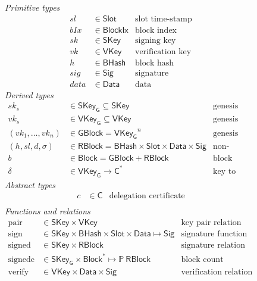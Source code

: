 \documentclass[11pt,a4paper]{article}
\newcommand{\powerset}[1]{\mathbb{P}~#1}
\newcommand{\type}[1]{\mathsf{#1}}
\newcommand{\seqof}[1]{#1^{*}}
\newcommand{\BHash}{\type{BHash}}  %
\newcommand{\Slot}{\type{Slot}}
\newcommand{\BlockIx}{\type{BlockIx}}
\newcommand{\GBlock}{\type{GBlock}}
\newcommand{\RBlock}{\type{RBlock}}
\newcommand{\Block}{\type{Block}}
\newcommand{\HCert}{\type{C}}
\newcommand{\SKey}{\type{SKey}}
\newcommand{\SKeyGen}{\type{SKey_G}}
\newcommand{\VKey}{\type{VKey}}
\newcommand{\VKeyGen}{\type{VKey_G}}
\newcommand{\Sig}{\type{Sig}}
\newcommand{\Data}{\type{Data}}
\newcommand{\signname}{sign}
\newcommand{\signedname}{signed}
\newcommand{\signedseqname}{signedc}
\newcommand{\verifyname}{verify}
\newcommand{\keypairname}{pair}
\newcommand{\delmap}{\delta}
\newcommand{\totalf}{\to}
\newcommand{\partialf}{\mapsto}
\begin{document}
\begin{figure}[h]
  \emph{Primitive types}
  \begin{align*}
    sl & \in \Slot    & \text{slot time-stamp}\\
   bIx & \in \BlockIx & \text{block index}\\
    sk & \in \SKey    & \text{signing key}\\
    vk & \in \VKey    & \text{verification key}\\
     h & \in \BHash   & \text{block hash}\\
   sig & \in \Sig     & \text{signature}\\
  data & \in \Data    & \text{data}
  \end{align*}
  \emph{Derived types}
  \begin{align*}
    sk_s & \in \SKeyGen \subseteq \SKey & \text{genesis block's signing key}\\
    vk_s & \in \VKeyGen \subseteq \VKey & \text{genesis block's verification key}\\
    (vk_1, \dotsc, vk_n) & \in \GBlock = \VKeyGen^n & \text{genesis block} \\
    (h, sl, d, \sigma) & \in \RBlock = \BHash \times \Slot \times \Data \times \Sig
      & \text{non-genesis block} \\
    b & \in \Block = \GBlock + \RBlock & \text{block} \\
    \delmap & \in \VKeyGen \totalf \seqof{\HCert}
      & \text{key to certificate list mapping}
  \end{align*}
  \emph{Abstract types}
  \begin{align*}
    c & \in \HCert & \text{delegation certificate}\\
  \end{align*}
  \emph{Functions and relations}
  \begin{align*}
    \text{\keypairname} & \in \SKey \times \VKey & \text{key pair relation}\\
    \text{\signname} & \in \SKey \times \BHash \times \Slot \times \Data \partialf \Sig
      & \text{signature function}\\
    \text{\signedname} & \in \SKey \times \RBlock & \text{signature relation}\\
    \text{\signedseqname} & \in \SKeyGen \times \seqof{\Block} \partialf \powerset{\RBlock}
      & \text{block count function}\\
    \text{\verifyname} & \in \VKey \times \Data \times \Sig
      & \text{verification relation}\\

\end{align*}
\end{figure}
\end{document}

